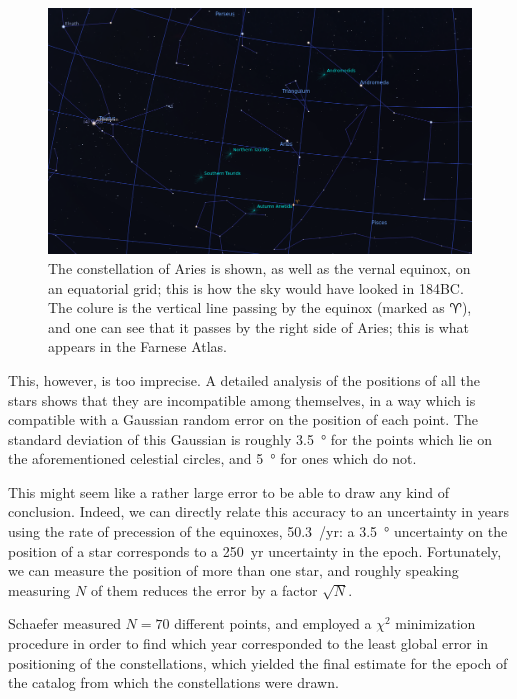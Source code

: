 \documentclass[main.tex]{subfiles}
\begin{document}
\begin{figure}[ht]
\centering
\includegraphics[width=\textwidth]{figures/aries_on_colure_184_BC.png}
\caption{The constellation of Aries is shown, as well as the vernal equinox, on an equatorial grid; this is how the sky would have looked in 184BC. The colure is the vertical line passing by the equinox (marked as \(\aries\)), and one can see that it passes by the right side of Aries; this is what appears in the Farnese Atlas.}
\label{fig:aries}
\end{figure}

This, however, is too imprecise. A detailed analysis of the positions of all the stars shows that they are incompatible among themselves, in a way which is compatible with a Gaussian random error on the position of each point. The standard deviation of this Gaussian is roughly \SI{3.5}{\degree} for the points which lie on the aforementioned celestial circles, and \SI{5}{\degree} for ones which do not. 

This might seem like a rather large error to be able to draw any kind of conclusion.
Indeed, we can directly relate this accuracy to an uncertainty in years using the rate of precession of the equinoxes, \SI{50.3}{\arcsec / yr}: a \SI{3.5}{\degree} uncertainty on the position of a star corresponds to a \SI{250}{yr} uncertainty in the epoch. 
Fortunately, we can measure the position of more than one star, and roughly speaking measuring \(N\) of them reduces the error by a factor \(\sqrt{N}\). 

Schaefer measured \(N = 70\) different points, and employed a \(\chi^2\) minimization procedure in order to find which year corresponded to the least global error in positioning of the constellations, which yielded the final estimate for the epoch of the catalog from which the constellations were drawn. 
\end{document}
